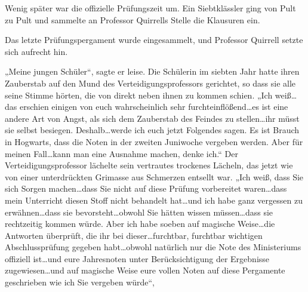 Wenig später war die offizielle Prüfungszeit um. Ein Siebtklässler ging von Pult zu Pult und sammelte an Professor Quirrells Stelle die Klausuren ein.

Das letzte Prüfungspergament wurde eingesammelt, und Professor Quirrell setzte sich aufrecht hin.

„Meine jungen Schüler“, sagte er leise.
Die Schülerin im siebten Jahr hatte ihren Zauberstab auf den Mund des Verteidigungsprofessors gerichtet, so dass sie alle seine Stimme hörten, die von direkt neben ihnen zu kommen schien.
„Ich weiß…das erschien einigen von euch wahrscheinlich sehr furchteinflößend…es ist eine andere Art von Angst, als sich dem Zauberstab des Feindes zu stellen…ihr müsst sie selbst besiegen. Deshalb…werde ich euch jetzt Folgendes sagen. Es ist Brauch in Hogwarts, dass die Noten in der zweiten Juniwoche vergeben werden. Aber für meinen Fall…kann man eine Ausnahme machen, denke ich.“
Der Verteidigungsprofessor lächelte sein vertrautes trockenes Lächeln, das jetzt wie von einer unterdrückten Grimasse aus Schmerzen entsellt war.
„Ich weiß, dass Sie sich Sorgen machen…dass Sie nicht auf diese Prüfung vorbereitet waren…dass mein Unterricht diesen Stoff nicht behandelt hat…und ich habe ganz vergessen zu erwähnen…dass sie bevorsteht…obwohl Sie hätten wissen müssen…dass sie rechtzeitig kommen würde. Aber ich habe soeben auf magische Weise…die Antworten überprüft, die ihr bei dieser…furchtbar, furchtbar wichtigen Abschlussprüfung gegeben habt…obwohl natürlich nur die Note des Ministeriums offiziell ist…und eure Jahresnoten unter Berücksichtigung der Ergebnisse zugewiesen…und auf magische Weise eure vollen Noten auf diese Pergamente geschrieben wie ich Sie vergeben würde“,
